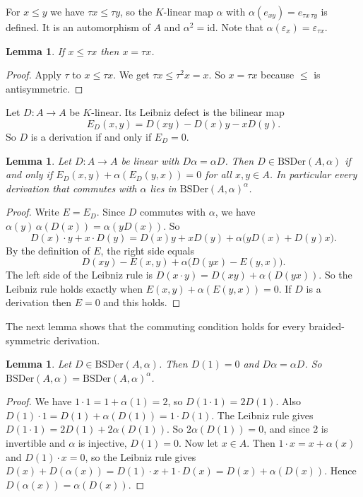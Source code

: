 \documentclass[]{interact}
\theoremstyle{plain}
\newtheorem{lemma}[theorem]{Lemma}
\theoremstyle{definition}
\theoremstyle{remark}
\newcommand{\BSDer}{\mathrm{BSDer}}
\begin{document}
For $x \le y$ we have $\tau x \le \tau y$, so the $K$-linear map $\alpha$ with $\alpha(e_{xy}) = e_{\tau x\, \tau y}$ is defined.
It is an automorphism of $A$ and $\alpha^2 = \mathrm{id}$.
Note that $\alpha(\varepsilon_x) = \varepsilon_{\tau x}$.

\begin{lemma}\label{lem:order}
If $x \le \tau x$ then $x = \tau x$.
\end{lemma}

\begin{proof}
Apply $\tau$ to $x \le \tau x$.
We get $\tau x \le \tau^2 x = x$.
So $x = \tau x$ because $\le$ is antisymmetric.
\end{proof}

Let $D \colon A \to A$ be $K$-linear.
Its Leibniz defect is the bilinear map
\[
E_D(x,y) = D(xy) - D(x)y - xD(y).
\]
So $D$ is a derivation if and only if $E_D = 0$.

\begin{lemma}\label{lem:criterion}
Let $D \colon A \to A$ be linear with $D\alpha = \alpha D$.
Then $D \in \BSDer(A,\alpha)$ if and only if $E_D(x,y) + \alpha(E_D(y,x)) = 0$ for all $x, y \in A$.
In particular every derivation that commutes with $\alpha$ lies in $\BSDer(A,\alpha)^\alpha$.
\end{lemma}

\begin{proof}
Write $E = E_D$.
Since $D$ commutes with $\alpha$, we have $\alpha(y)\,\alpha(D(x)) = \alpha(yD(x))$.
So
\[
D(x) \cdot y + x \cdot D(y) = D(x)y + xD(y) + \alpha\bigl(yD(x) + D(y)x\bigr).
\]
By the definition of $E$, the right side equals
\[
D(xy) - E(x,y) + \alpha\bigl(D(yx) - E(y,x)\bigr).
\]
The left side of the Leibniz rule is $D(x \cdot y) = D(xy) + \alpha(D(yx))$.
So the Leibniz rule holds exactly when $E(x,y) + \alpha(E(y,x)) = 0$.
If $D$ is a derivation then $E = 0$ and this holds.
\end{proof}

The next lemma shows that the commuting condition holds for every braided-symmetric derivation. %

\begin{lemma}\label{lem:commute}
Let $D \in \BSDer(A,\alpha)$.
Then $D(1) = 0$ and $D\alpha = \alpha D$.
So $\BSDer(A,\alpha) = \BSDer(A,\alpha)^\alpha$.
\end{lemma}

\begin{proof}
We have $1 \cdot 1 = 1 + \alpha(1) = 2$, so $D(1 \cdot 1) = 2D(1)$.
Also $D(1) \cdot 1 = D(1) + \alpha(D(1)) = 1 \cdot D(1)$.
The Leibniz rule gives $D(1 \cdot 1) = 2D(1) + 2\alpha(D(1))$.
So $2\alpha(D(1)) = 0$, and since $2$ is invertible and $\alpha$ is injective, $D(1) = 0$.
Now let $x \in A$.
Then $1 \cdot x = x + \alpha(x)$ and $D(1) \cdot x = 0$, so the Leibniz rule gives $D(x) + D(\alpha(x)) = D(1) \cdot x + 1 \cdot D(x) = D(x) + \alpha(D(x))$.
Hence $D(\alpha(x)) = \alpha(D(x))$.
\end{proof}
\end{document}
